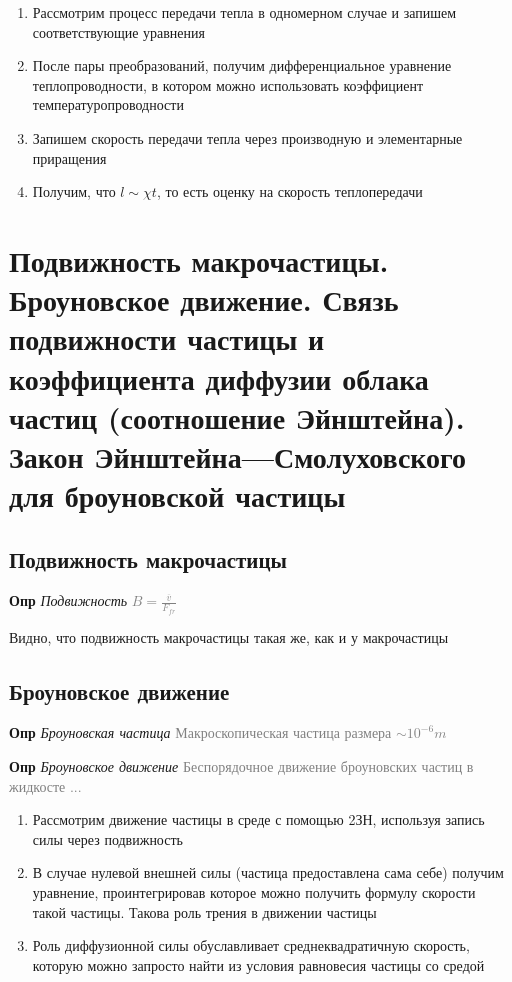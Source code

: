 \documentclass[a4paper, 14pt]{article}
\begin{document}
    \begin{enumerate}
        \item Рассмотрим процесс передачи тепла в одномерном случае и запишем соответствующие уравнения
        \item После пары преобразований, получим дифференциальное уравнение теплопроводности, в котором можно
        использовать коэффициент температуропроводности
        \item Запишем скорость передачи тепла через производную и элементарные приращения
        \item Получим, что $l \sim \chi t$, то есть оценку на скорость теплопередачи
    \end{enumerate}

    \section{Подвижность макрочастицы.
    Броуновское движение.
    Связь подвижности частицы и коэффициента диффузии облака частиц (соотношение Эйнштейна).
    Закон Эйнштейна—Смолуховского для броуновской частицы}

    \subsection{Подвижность макрочастицы}

    \textbf{Опр} \textit{Подвижность} \textcolor{gray}{$B = \frac{\overline{v}}{F_{fr}}$}

    Видно, что подвижность макрочастицы такая же, как и у макрочастицы

    \subsection{Броуновское движение}

    \textbf{Опр} \textit{Броуновская частица} \textcolor{gray}{Макроскопическая частица размера $\sim 10^{-6} m$}

    \textbf{Опр} \textit{Броуновское движение} \textcolor{gray}{Беспорядочное движение броуновских частиц в жидкосте ...}

    \begin{enumerate}
        \item Рассмотрим движение частицы в среде с помощью 2ЗН, используя запись силы через подвижность
        \item В случае нулевой внешней силы (частица предоставлена сама себе) получим уравнение, проинтегрировав
        которое можно получить формулу скорости такой частицы.
        Такова роль трения в движении частицы
        \item Роль диффузионной силы обуславливает среднеквадратичную скорость, которую можно запросто найти из условия
        равновесия частицы со средой
    \end{enumerate}
\end{document}
